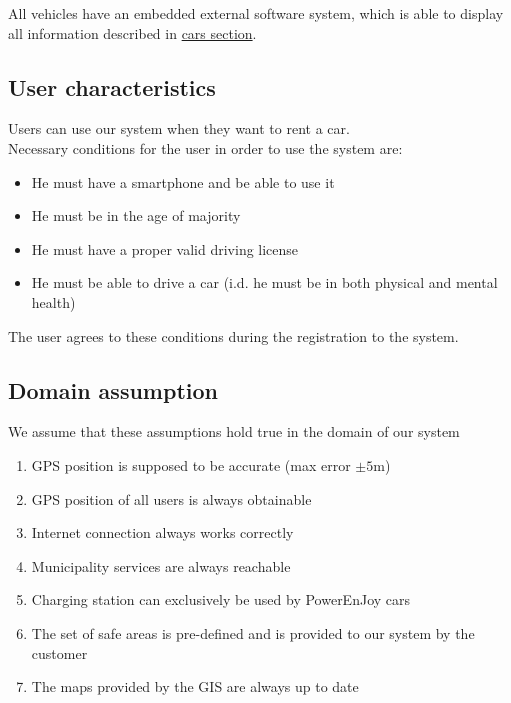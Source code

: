 All vehicles have an embedded external software system, which is able to display all information described in \hyperref[sec:cars]{cars section}.

\subsection{User characteristics}
	Users can use our system when they want to rent a car.\\
	Necessary conditions for the user in order to use the system are:
	\begin{itemize}
		\item He must have a smartphone and be able to use it
		\item He must be in the age of majority
		\item He must have a proper valid driving license
		\item He must be able to drive a car (i.d. he must be in both physical and mental health)
	\end{itemize}
	The user agrees to these conditions during the registration to the system.

\subsection{Domain assumption}
	We assume that these assumptions hold true in the domain of our system 
	\begin{enumerate}[label=\textbf{DA\arabic*}]
		\item GPS position is supposed to be accurate (max error $\pm5$m)
		\item GPS position of all users is always obtainable
		\item Internet connection always works correctly
		\item Municipality services are always reachable
		\item Charging station can exclusively be used by PowerEnJoy cars
		\item The set of safe areas is pre-defined and is provided to our system by the customer
		\item The maps provided by the GIS are always up to date
		
	\end{enumerate}
	
\clearpage
